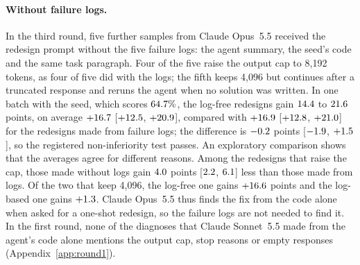 \paragraph{Without failure logs.}\label{sec:redesign-logfree} In the third round, five further samples from Claude Opus~5.5 received the redesign
prompt without the five failure logs: the agent summary, the seed's code and the same task paragraph. Four of the five
raise the output cap to 8{,}192 tokens, as four of five did with the logs; the fifth keeps 4{,}096 but continues after a
truncated response and reruns the agent when no solution was written. In one batch with the seed, which scores $64.7\%$, the
log-free redesigns gain $14.4$ to $21.6$ points, on average $+16.7$ [$+12.5$, $+20.9$],
compared with $+16.9$ [$+12.8$, $+21.0$] for the redesigns made from failure logs; the difference is
$-0.2$ points [$-1.9$, $+1.5$], so the registered non-inferiority test passes. An exploratory comparison shows that the
averages agree for different reasons. Among the redesigns that raise the cap, those made without logs gain $4.0$
points [$2.2$, $6.1$] less than those made from logs. Of the two that keep 4{,}096, the
log-free one gains $+16.6$ points and the log-based one gains $+1.3$. Claude Opus~5.5 thus finds the fix from the code
alone when asked for a one-shot redesign, so the failure logs are not needed to find it. In the first round, none of the
\nladConeatt{} diagnoses that Claude Sonnet~5.5 made from the agent's code alone mentions the output cap, stop reasons or
empty responses (Appendix~\ref{app:round1}).
